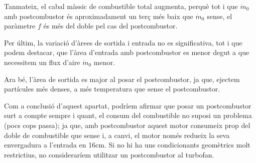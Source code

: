 \noindent Tanmateix, el cabal màssic de combustible total augmenta, perquè tot i que $ \dot{m}_0$ amb postcombustor és aproximadament un terç més baix  que $ \dot{m}_0$ sense, el paràmetre $ f$ és més del doble pel cas del postcombustor.

\noindent Per últim, la variació d'àrees de sortida i entrada no es significativa, tot i que podem destacar, que l'àrea d'entrada amb postcombustor es menor degut a que necessitem un flux d'aire $ \dot{m}_0$ menor.

\noindent Ara bé, l'àrea de sortida es major al posar el postcombustor, ja que, ejectem partícules més denses, a més temperatura que sense el postcombustor.

\noindent Com a conclusió d'aquest apartat, podríem afirmar que posar un postcombustor surt a compte sempre i quant, el consum del combustible no suposi un problema (pocs cops passa); ja que, amb postcombustor aquest motor consumeix prop del doble de combustible que sense i, a canvi, el motor només redueix la seva envergadura a l'entrada en 16cm. Si no hi ha uns condicionants geomètrics molt restrictius, no consideraríem utilitzar un postcombustor al turbofan. 

